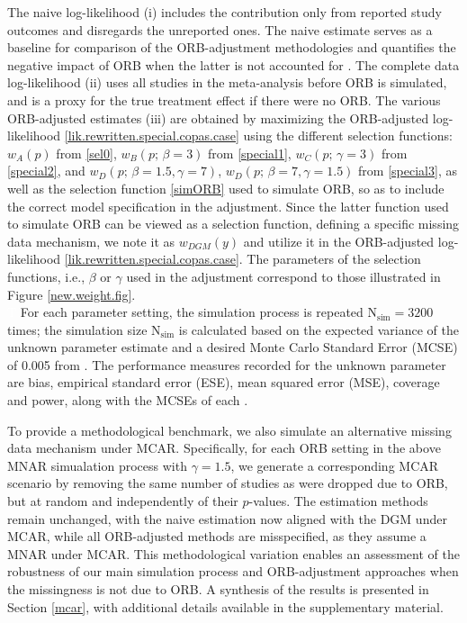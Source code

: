 \documentclass[twocolumn]{article}\usepackage[]{graphicx}\usepackage[]{xcolor}
\begin{document}
The naive log-likelihood (i) includes the contribution only from reported study outcomes and disregards the unreported ones. The naive estimate serves as a baseline for comparison of the ORB-adjustment methodologies and quantifies the negative impact of ORB when the latter is not accounted for \citep{reviewselection, Copas2019}. The complete data log-likelihood (ii) uses all studies in the meta-analysis before ORB is simulated, and is a proxy for the true treatment effect if there were no ORB. The various ORB-adjusted estimates (iii) are obtained by maximizing the ORB-adjusted log-likelihood \eqref{lik.rewritten.special.copas.case} using the different selection functions:  $w_A(p)$ from \eqref{sel0}, $w_B(p \text{; } \beta=3)$ from \eqref{special1}, $w_C(p \text{; } \gamma=3)$ from \eqref{special2}, and $w_D(p \text{; } \beta=1.5, \gamma=7)$, $w_D(p \text{; } \beta=7, \gamma=1.5)$ from \eqref{special3}, as well as the selection function \eqref{simORB} used to simulate ORB, so as to include the correct model specification in the adjustment. Since the latter function used to simulate ORB can be viewed as a selection function, defining a specific missing data mechanism, we note it as $w_{DGM}(y)$ and utilize it in the ORB-adjusted log-likelihood \eqref{lik.rewritten.special.copas.case}. The parameters of the selection functions, i.e., $\beta$ or $\gamma$ used in the adjustment correspond to those illustrated in Figure \ref{new.weight.fig}.\\
\textcolor{white}{T} For each parameter setting, the simulation process is repeated $\text{N}_{\text{sim}} = 3200$ times; the simulation size $\text{N}_{\text{sim}}$ is calculated based on the expected variance of the unknown parameter estimate \citep{IntHout2014, sim} and a desired Monte Carlo Standard Error (MCSE) of 0.005 from \citet{IntHout2014, sim}. The performance measures recorded for the unknown parameter are bias, empirical standard error (ESE), mean squared error (MSE), coverage and power, along with the MCSEs of each \citep{IntHout2014, sim}.

To provide a methodological benchmark, we also simulate an alternative missing data mechanism under MCAR. Specifically, for each ORB setting in the above MNAR simualation process with $\gamma = 1.5$, we generate a corresponding MCAR scenario by removing the same number of studies as were dropped due to ORB, but at random and independently of their $p$-values. The estimation methods remain unchanged, with the naive estimation now aligned with the DGM under MCAR, while all ORB-adjusted methods are misspecified, as they assume a MNAR under MCAR. This methodological variation enables an assessment of the robustness of our main simulation process and ORB-adjustment approaches when the missingness is not due to ORB. A synthesis of the results is presented in Section \ref{mcar}, with additional details available in the supplementary material.
\end{document}
